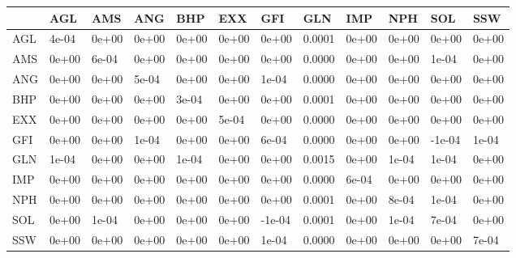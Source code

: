 \documentclass[11pt,preprint, authoryear]{elsarticle}
\let\origtable\table
\let\endorigtable\endtable
\renewenvironment{table}[1][2] {
    \expandafter\origtable\expandafter[H]
} {
    \endorigtable
}
\numberwithin{equation}{section}
\numberwithin{figure}{section}
\numberwithin{table}{section}
\begin{document}
\begin{table}[H]

\caption{\label{tab:Covariance Matrix_R}Covariance Matrix: Resources}
\centering
\begin{tabular}[t]{l|l|l|l|l|l|l|l|l|l|l|l}
\hline
  & AGL & AMS & ANG & BHP & EXX & GFI & GLN & IMP & NPH & SOL & SSW\\
\hline
AGL & 4e-04 & 0e+00 & 0e+00 & 0e+00 & 0e+00 & 0e+00 & 0.0001 & 0e+00 & 0e+00 & 0e+00 & 0e+00\\
\hline
AMS & 0e+00 & 6e-04 & 0e+00 & 0e+00 & 0e+00 & 0e+00 & 0.0000 & 0e+00 & 0e+00 & 1e-04 & 0e+00\\
\hline
ANG & 0e+00 & 0e+00 & 5e-04 & 0e+00 & 0e+00 & 1e-04 & 0.0000 & 0e+00 & 0e+00 & 0e+00 & 0e+00\\
\hline
BHP & 0e+00 & 0e+00 & 0e+00 & 3e-04 & 0e+00 & 0e+00 & 0.0001 & 0e+00 & 0e+00 & 0e+00 & 0e+00\\
\hline
EXX & 0e+00 & 0e+00 & 0e+00 & 0e+00 & 5e-04 & 0e+00 & 0.0000 & 0e+00 & 0e+00 & 0e+00 & 0e+00\\
\hline
GFI & 0e+00 & 0e+00 & 1e-04 & 0e+00 & 0e+00 & 6e-04 & 0.0000 & 0e+00 & 0e+00 & -1e-04 & 1e-04\\
\hline
GLN & 1e-04 & 0e+00 & 0e+00 & 1e-04 & 0e+00 & 0e+00 & 0.0015 & 0e+00 & 1e-04 & 1e-04 & 0e+00\\
\hline
IMP & 0e+00 & 0e+00 & 0e+00 & 0e+00 & 0e+00 & 0e+00 & 0.0000 & 6e-04 & 0e+00 & 0e+00 & 0e+00\\
\hline
NPH & 0e+00 & 0e+00 & 0e+00 & 0e+00 & 0e+00 & 0e+00 & 0.0001 & 0e+00 & 8e-04 & 1e-04 & 0e+00\\
\hline
SOL & 0e+00 & 1e-04 & 0e+00 & 0e+00 & 0e+00 & -1e-04 & 0.0001 & 0e+00 & 1e-04 & 7e-04 & 0e+00\\
\hline
SSW & 0e+00 & 0e+00 & 0e+00 & 0e+00 & 0e+00 & 1e-04 & 0.0000 & 0e+00 & 0e+00 & 0e+00 & 7e-04\\
\hline
\end{tabular}
\end{table}


\end{document}
